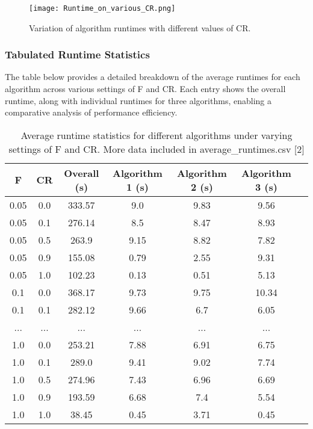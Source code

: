 \documentclass[12pt,a4paper]{article}
\begin{document}
\begin{figure}[h]
    \centering
    \texttt{[image: Runtime\_on\_various\_CR.png]}
    \caption{Variation of algorithm runtimes with different values of CR.}
    \label{fig:runtime-cr}
\end{figure}

\subsubsection{Tabulated Runtime Statistics}
The table below provides a detailed breakdown of the average runtimes for each algorithm across various settings of F and CR. Each entry shows the overall runtime, along with individual runtimes for three algorithms, enabling a comparative analysis of performance efficiency.

\begin{table}[h]
    \centering
    \begin{tabular}{ccccccc}
        \hline
        F & CR & Overall (s) & Algorithm 1 (s) & Algorithm 2 (s) & Algorithm 3 (s) \\
        \hline
        0.05 & 0.0 & 333.57 & 9.0 & 9.83 & 9.56 \\
        0.05 & 0.1 & 276.14 & 8.5 & 8.47 & 8.93 \\
        0.05&0.5&263.9&9.15&8.82&7.82 \\
        0.05 & 0.9 & 155.08 & 0.79&2.55&9.31 \\
        0.05&1.0&102.23&0.13&0.51&5.13 \\
        0.1&0.0&368.17&9.73&9.75&10.34 \\
        0.1&0.1&282.12&9.66&6.7&6.05 \\
         ...&...&...&...&...&... \\
        1.0 & 0.0 & 253.21&7.88&6.91&6.75 \\
        1.0 & 0.1 & 289.0&9.41&9.02&7.74 \\
        1.0 & 0.5 & 274.96&7.43&6.96&6.69 \\
        1.0 & 0.9 & 193.59&6.68&7.4&5.54 \\
        1.0 & 1.0 & 38.45 & 0.45 & 3.71 & 0.45 \\
        \hline
    \end{tabular}
    \caption{Average runtime statistics for different algorithms under varying settings of F and CR. More data included in average\_runtimes.csv [2]}
    \label{tab:runtime-stats}
\end{table}
\end{document}
